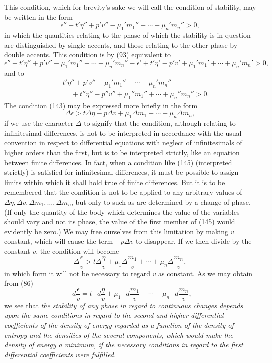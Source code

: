\documentclass[11pt]{article}
\newcommand{\dd}{\mathop{}\!d}
\newcommand{\eps}{\epsilon}
\newcommand{\D}{\Delta}
\begin{document}
This condition, which for brevity's sake we will call the condition of stability, may be written in the form
\begin{equation}
\eps''-t'\eta''+p'v''-\mu_1' m_1''-\cdots-\mu_n' m_n''>0,
\end{equation}
in which the quantities relating to the phase of which the stability is in question are distinguished by single accents, and those relating to the other phase by double accents. This condition is by (93) equivalent to
\begin{equation}
\eps''-t'\eta''+p'v''-\mu_1' m_1''-\cdots-\mu_n' m_n''
-\eps'+t'\eta'-p'v'+\mu_1' m_1'+\cdots+\mu_n' m_n'>0,
\end{equation}
and to
\begin{equation}
\begin{aligned}
&-t'\eta''+p'v''-\mu_1'm_1''-\cdots-\mu_n'm_n''\\
&\qquad{}+t''\eta''-p''v''+\mu_1''m_1''+\cdots+\mu_n''m_n''>0.
\end{aligned}
\end{equation}
The condition (143) may be expressed more briefly in the form
\begin{equation}
\D\eps>t\D\eta-p\D v+\mu_1\D m_1+\cdots+\mu_n\D m_n,
\end{equation}
if we use the character $\D$ to signify that the condition, although relating to infinitesimal differences, is not to be interpreted in accordance with the usual convention in respect to differential equations with neglect of infinitesimals of higher orders than the first, but is to be interpreted strictly, like an equation between finite differences. In fact, when a condition like (145) (interpreted strictly) is satisfied for infinitesimal differences, it must be possible to assign limits within which it shall hold true of finite differences. But it is to be remembered that the condition is not to be applied to any arbitrary values of $\D\eta,\D v,\D m_1,\ldots,\D m_n$, but only to such as are determined by a change of phase. (If only the quantity of the body which determines the value of the variables should vary and not its phase, the value of the first member of (145) would evidently be zero.) We may free ourselves from this limitation by making $v$ constant, which will cause the term $-p\D v$ to disappear. If we then divide by the constant $v$, the condition will become
\begin{equation}
\D\frac{\eps}{v}>t\D\frac{\eta}{v}+\mu_1\D\frac{m_1}{v}+\cdots+\mu_n\D\frac{m_n}{v},
\end{equation}
in which form it will not be necessary to regard $v$ as constant. As we may obtain from (86)
\begin{equation}
\dd\frac{\eps}{v}=t\,\dd\frac{\eta}{v}+\mu_1\,\dd\frac{m_1}{v}+\cdots+\mu_n\,\dd\frac{m_n}{v},
\end{equation}
we see that \textit{the stability of any phase in regard to continuous changes depends upon the same conditions in regard to the second and higher differential coefficients of the density of energy regarded as a function of the density of entropy and the densities of the several components, which would make the density of energy a minimum, if the necessary conditions in regard to the first differential coefficients were fulfilled.}
\end{document}
